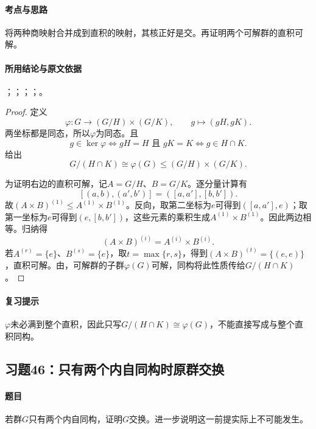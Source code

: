 \paragraph{考点与思路}
将两种商映射合并成到直积的映射，其核正好是交。再证明两个可解群的直积可解。

\paragraph{所用结论与原文依据}
；；；；。


\begin{proof}
定义
\[
\varphi:G\longrightarrow(G/H)\times(G/K),
\qquad g\longmapsto(gH,gK).
\]
两坐标都是同态，所以$\varphi$为同态。且
\[
g\in\ker\varphi\iff gH=H\text{ 且 }gK=K
\iff g\in H\cap K.
\]
给出
\[
G/(H\cap K)\cong\varphi(G)\le(G/H)\times(G/K).
\]

为证明右边的直积可解，记$A=G/H$、$B=G/K$。逐分量计算有
\[
[(a,b),(a',b')]=([a,a'],[b,b']).
\]
故$(A\times B)^{(1)}\le A^{(1)}\times B^{(1)}$。反向，取第二坐标为$e$可得到$([a,a'],e)$；取第一坐标为$e$可得到$(e,[b,b'])$，这些元素的乘积生成$A^{(1)}\times B^{(1)}$。因此两边相等。归纳得
\[
(A\times B)^{(i)}=A^{(i)}\times B^{(i)}.
\]
若$A^{(r)}=\{e\}$、$B^{(s)}=\{e\}$，取$t=\max\{r,s\}$，得到$(A\times B)^{(t)}=\{(e,e)\}$，直积可解。由，可解群的子群$\varphi(G)$可解，同构将此性质传给$G/(H\cap K)$。
\end{proof}

\paragraph{复习提示}
$\varphi$未必满到整个直积，因此只写$G/(H\cap K)\cong\varphi(G)$，不能直接写成与整个直积同构。


\subsection{习题46：\texorpdfstring{只有两个内自同构时原群交换}{只有两个内自同构时原群交换}}
\label{ex:2:46}

\paragraph{题目}
若群$G$只有两个内自同构，证明$G$交换。进一步说明这一前提实际上不可能发生。

